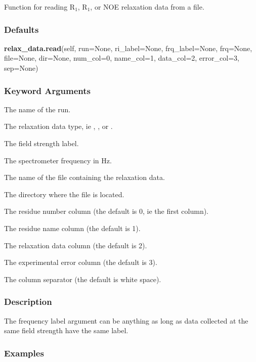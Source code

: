 Function for reading R$_1$, R$_1$, or NOE relaxation data from a file.

\subsubsection{Defaults}

\textsf{\textbf{relax\_data.read}(self, run=None, ri\_label=None, frq\_label=None, frq=None, file=None, dir=None, num\_col=0, name\_col=1, data\_col=2, error\_col=3, sep=None)}


\subsubsection{Keyword Arguments}


  The name of the run.

  The relaxation data type, ie 
, 
, or 
.

  The field strength label.

  The spectrometer frequency in Hz.

  The name of the file containing the relaxation data.

  The directory where the file is located.

  The residue number column (the default is 0, ie the first column).

  The residue name column (the default is 1).

  The relaxation data column (the default is 2).

  The experimental error column (the default is 3).

  The column separator (the default is white space).

\subsubsection{Description}

The frequency label argument can be anything as long as data collected at the same field
strength have the same label.


\subsubsection{Examples}

